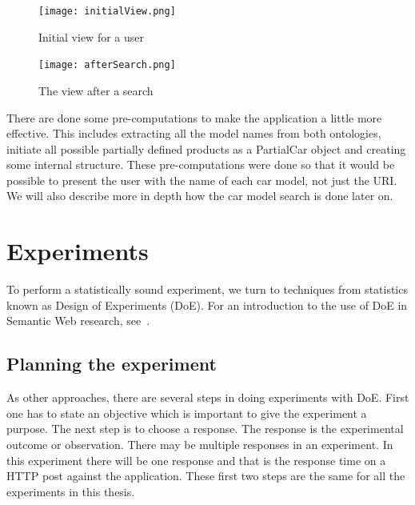 \documentclass{llncs}
\begin{document}
\begin{figure}
  \centering
      \texttt{[image: initialView.png]}
  \caption{Initial view for a user}\label{initialView}
\end{figure}

\begin{figure}
  \centering
      \texttt{[image: afterSearch.png]}
  \caption{The view after a search}\label{afterSearch}
\end{figure}
There are done some pre-computations to make the application a little
more effective. This includes extracting all the model names from both
ontologies, initiate all possible partially defined products as a
PartialCar object and creating some internal structure. These
pre-computations were done so that it would be possible to present the
user with the name of each car model, not just the URI. We will also
describe more in depth how the car model search is done later on.


\section{Experiments}\label{Results}

To perform a statistically sound experiment, we turn to techniques
from statistics known as Design of Experiments (DoE). For an
introduction to the use of DoE in Semantic Web research, see~\cite{Kjern}.

\subsection{Planning the experiment}
As other approaches, there are several steps in doing experiments with
DoE.  First one has to state an objective which is important to give
the experiment a purpose.  The next step is to choose a response. The
response is the experimental outcome or observation. There may be
multiple responses in an experiment. In this experiment there will be
one response and that is the response time on a HTTP post against the
application.  These first two steps are the same for all the
experiments in this thesis.
\end{document}
